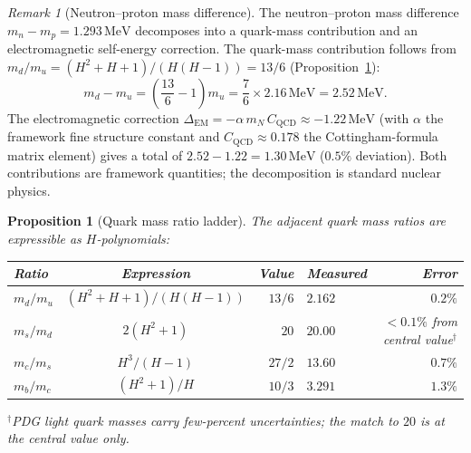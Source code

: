 \documentclass[11pt,a4paper]{article}
\let\hline\midrule
\newtheorem{proposition}[theorem]{Proposition}
\theoremstyle{definition}
\theoremstyle{remark}
\newtheorem{remark}[theorem]{Remark}
\begin{document}
\begin{remark}[Neutron--proton mass difference]\label{rem:neutron_proton}
The neutron--proton mass difference $m_n-m_p=1.293\,\mathrm{MeV}$ decomposes into a quark-mass contribution and an electromagnetic self-energy correction. The quark-mass contribution follows from $m_d/m_u=(H^2+H+1)/(H(H-1))=13/6$ (Proposition~\ref{prop:quark_ratios}):
\[
m_d-m_u=\left(\frac{13}{6}-1\right)m_u = \frac{7}{6}\times 2.16\,\mathrm{MeV}=2.52\,\mathrm{MeV}.
\]
The electromagnetic correction $\Delta_{\mathrm{EM}}=-\alpha\,m_N\,C_{\mathrm{QCD}}\approx -1.22\,\mathrm{MeV}$ (with $\alpha$ the framework fine structure constant and $C_{\mathrm{QCD}}\approx 0.178$ the Cottingham-formula matrix element) gives a total of $2.52-1.22=1.30\,\mathrm{MeV}$ ($0.5\%$ deviation). Both contributions are framework quantities; the decomposition is standard nuclear physics.
\end{remark}

\begin{proposition}[Quark mass ratio ladder]\label{prop:quark_ratios}
The adjacent quark mass ratios are expressible as $H$-polynomials:
\begin{center}
\renewcommand{\arraystretch}{1.15}
\begin{tabular}{lcrlr}
\hline
Ratio & Expression & Value & Measured & Error \\
\hline
$m_d/m_u$ & $(H^2+H+1)/(H(H-1))$ & $13/6$ & $2.162$ & $0.2\%$ \\
$m_s/m_d$ & $2(H^2+1)$ & $20$ & $20.00$ & $<0.1\%$ from central value$^\dagger$ \\
$m_c/m_s$ & $H^3/(H-1)$ & $27/2$ & $13.60$ & $0.7\%$ \\
$m_b/m_c$ & $(H^2+1)/H$ & $10/3$ & $3.291$ & $1.3\%$ \\
\hline
\end{tabular}
\end{center}
\noindent${}^\dagger$PDG light quark masses carry few-percent uncertainties; the match to $20$ is at the central value only.\end{proposition}
\end{document}
